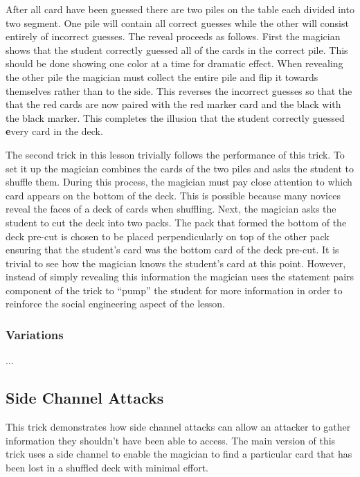 After all card have been guessed there are two piles on the table each divided
into two segment.  One pile will contain all correct guesses while the other
will consist entirely of incorrect guesses.  The reveal proceeds as follows.
First the magician shows that the student correctly guessed all of the cards
in the correct pile.  This should be done showing one color at a time for
dramatic effect.  When revealing the other pile the magician must collect the
entire pile and flip it towards themselves rather than to the side.  This
reverses the incorrect guesses so that the that the red cards are now paired
with the red marker card and the black with the black marker.  This completes
the illusion that the student correctly guessed {\textbf every} card in the
deck.

The second trick in this lesson trivially follows the performance of this trick.
To set it up the magician combines the cards of the two piles and asks the
student to shuffle them.  During this process, the magician must pay close
attention to which card appears on the bottom of the deck.  This is possible
because many novices reveal the faces of a deck of cards when shuffling.  Next,
the magician asks the student to cut the deck into two packs.  The pack that
formed the bottom of the deck pre-cut is chosen to be placed perpendicularly on
top of the other pack ensuring that the student's card was the bottom card of
the deck pre-cut.  It is trivial to see how the magician knows the student's
card at this point.  However, instead of simply revealing this information the
magician uses the statement pairs component of the trick to ``pump'' the student
for more information in order to reinforce the social engineering aspect of the
lesson.

\subsubsection{Variations}

...

\subsection{Side Channel Attacks}

This trick demonstrates how side channel attacks can allow an attacker to
gather information they shouldn't have been able to access.
The main version of this trick uses a side channel to enable the magician to
find a particular card that has been lost in a shuffled deck with minimal
effort.

